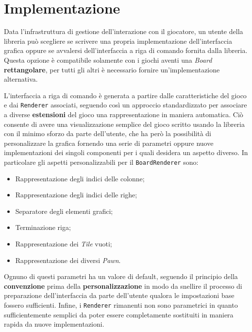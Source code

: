 \section{Implementazione}







Data l'infrastruttura di gestione dell'interazione con il giocatore, un utente della libreria può scegliere se scrivere una propria implementazione dell'interfaccia grafica oppure se avvalersi dell'interfaccia a riga di comando fornita dalla libreria.
%
Questa opzione è compatibile solamente con i giochi aventi una \textit{Board} \textbf{rettangolare}, per tutti gli altri è necessario fornire un'implementazione alternativa.

L'interfaccia a riga di comando è generata a partire dalle caratteristiche del gioco e dai \texttt{Renderer} associati, seguendo così un approccio standardizzato per associare a diverse \textbf{estensioni} del gioco una rappresentazione in maniera automatica.
%
Ciò consente di avere una visualizzazione semplice del gioco scritto usando la libreria con il minimo sforzo da parte dell'utente, che ha però la possibilità di personalizzare la grafica fornendo una serie di parametri oppure nuove implementazioni dei singoli componenti per i quali desidera un aspetto diverso.
%
In particolare gli aspetti personalizzabili per il \texttt{BoardRenderer} sono:
\begin{itemize}
  \item Rappresentazione degli indici delle colonne;
  \item Rappresentazione degli indici delle righe;
  \item Separatore degli elementi grafici;
  \item Terminazione riga;
  \item Rappresentazione dei \textit{Tile} vuoti;
  \item Rappresentazione dei diversi \textit{Pawn}.
\end{itemize}
%
Ognuno di questi parametri ha un valore di default, seguendo il principio della \textbf{convenzione} prima della \textbf{personalizzazione} in modo da snellire il processo di preparazione dell'interfaccia da parte dell'utente qualora le impostazioni base fossero sufficienti.
%
Infine, i \texttt{Renderer} rimanenti non sono parametrici in quanto sufficientemente semplici da poter essere completamente sostituiti in maniera rapida da nuove implementazioni.

